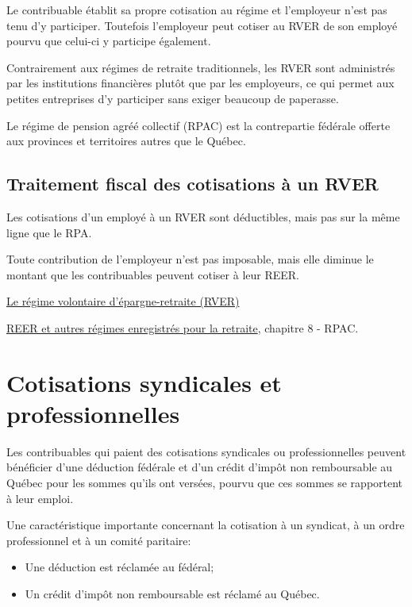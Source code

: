 Le contribuable établit sa propre cotisation au régime et l'employeur n'est pas tenu d'y participer. Toutefois l'employeur peut cotiser au RVER de son employé pourvu que celui-ci y participe également.

Contrairement aux régimes de retraite traditionnels, les RVER sont administrés par les institutions financières plutôt que par les employeurs, ce qui permet aux petites entreprises d'y participer sans exiger beaucoup de paperasse.

Le régime de pension agréé collectif (RPAC) est la contrepartie fédérale offerte aux provinces et territoires autres que le Québec.


\subsection{Traitement fiscal des cotisations à un RVER}
Les cotisations d'un employé à un RVER sont déductibles, mais pas sur la même ligne que le RPA. 

Toute contribution de l'employeur n'est pas imposable, mais elle diminue le montant que les contribuables peuvent cotiser à leur REER.

\href{https://www.rrq.gouv.qc.ca/fr/retraite/rver/Pages/rver.aspx}{Le régime volontaire d'épargne-retraite (RVER)}

\href{https://www.canada.ca/fr/agence-revenu/services/formulaires-publications/publications/t4040/reer-autres-regimes-enregistres-retraite.html}{REER et autres régimes enregistrés pour la retraite}, chapitre 8 - RPAC.



\section{Cotisations syndicales et professionnelles}
\begin{intro}
	Les contribuables qui paient des cotisations syndicales ou professionnelles peuvent bénéficier d'une déduction fédérale et d'un crédit d'impôt non remboursable au Québec pour les sommes qu'ils ont versées, pourvu que ces sommes se rapportent à leur emploi.
\end{intro}
\begin{note}
	Une caractéristique importante concernant la cotisation à un syndicat, à un ordre professionnel et à un comité paritaire:
	\begin{itemize}
		\item Une déduction est réclamée au fédéral;
		\item Un crédit d'impôt non remboursable est réclamé au Québec.
	\end{itemize}
\end{note}


